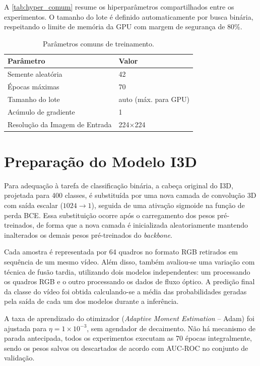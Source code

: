 \documentclass[12pt, %
openright, 
oneside, %
a4paper,    %
brazil]{facom-ufu-abntex2}
\begin{document}
A \autoref{tab:hyper_comum} resume os hiperparâmetros compartilhados entre os experimentos. O tamanho do lote é definido automaticamente por busca binária, respeitando o limite de memória da GPU com margem de segurança de 80\%.

\begin{table}[htbp]
\centering
\caption{Parâmetros comuns de treinamento.}
\label{tab:hyper_comum}
\begin{tabular}{ll}
\toprule
\textbf{Parâmetro} & \textbf{Valor} \\
\midrule
Semente aleatória & 42 \\
Épocas máximas & 70 \\
Tamanho do lote & auto (máx. para GPU) \\
Acúmulo de gradiente & 1 \\
Resolução da Imagem de Entrada & 224$\times$224 \\
\bottomrule
\end{tabular}
\end{table}

\section[Preparação do Modelo I3D]{Preparação do Modelo I3D}

Para adequação à tarefa de classificação binária, a cabeça original do I3D, projetada para 400 classes, é substituída por uma nova camada de convolução 3D com saída escalar ($1024 \to 1$), seguida de uma ativação sigmoide na função de perda BCE. Essa substituição ocorre após o carregamento dos pesos pré-treinados, de forma que a nova camada é inicializada aleatoriamente mantendo inalterados os demais pesos pré-treinados do \textit{backbone}.

Cada amostra é representada por 64 quadros no formato RGB retirados em sequência de um mesmo vídeo.  Além disso, também avaliou-se uma variação com técnica de fusão tardia, utilizando dois modelos independentes: um processando os quadros RGB e o outro processando os dados de fluxo óptico. A predição final da classe do vídeo foi obtida calculando-se a média das probabilidades geradas pela saída de cada um dos modelos durante a inferência.

A taxa de aprendizado do otimizador (\textit{Adaptive Moment Estimation} -- Adam) foi ajustada para $\eta = 1 \times 10^{-3}$, sem agendador de decaimento. Não há mecanismo de parada antecipada, todos os experimentos executam as 70 épocas integralmente, sendo os pesos salvos ou descartados de acordo com AUC-ROC no conjunto de validação.
\end{document}
